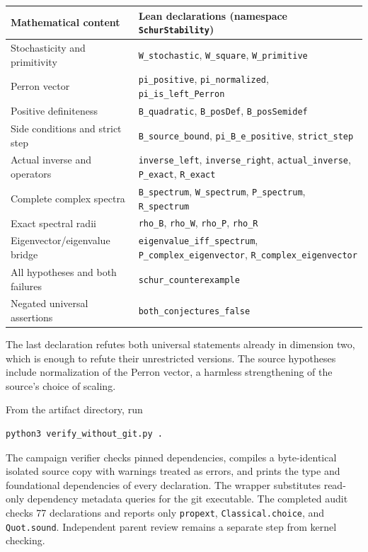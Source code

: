 \documentclass[11pt]{article}
\begin{document}
\begin{center}
\small
\begin{tabular}{@{}>{\raggedright\arraybackslash}p{}>{\raggedright\arraybackslash}p{}@{}}
\toprule
Mathematical content & Lean declarations (namespace \texttt{SchurStability})\\
\midrule
Stochasticity and primitivity & \texttt{W\_stochastic}, \texttt{W\_square}, \texttt{W\_primitive}\\
Perron vector & \texttt{pi\_positive}, \texttt{pi\_normalized}, \texttt{pi\_is\_left\_Perron}\\
Positive definiteness & \texttt{B\_quadratic}, \texttt{B\_posDef}, \texttt{B\_posSemidef}\\
Side conditions and strict step & \texttt{B\_source\_bound}, \texttt{pi\_B\_e\_positive}, \texttt{strict\_step}\\
Actual inverse and operators & \texttt{inverse\_left}, \texttt{inverse\_right}, \texttt{actual\_inverse}, \texttt{P\_exact}, \texttt{R\_exact}\\
Complete complex spectra & \texttt{B\_spectrum}, \texttt{W\_spectrum}, \texttt{P\_spectrum}, \texttt{R\_spectrum}\\
Exact spectral radii & \texttt{rho\_B}, \texttt{rho\_W}, \texttt{rho\_P}, \texttt{rho\_R}\\
Eigenvector/eigenvalue bridge & \texttt{eigenvalue\_iff\_spectrum}, \texttt{P\_complex\_eigenvector}, \texttt{R\_complex\_eigenvector}\\
All hypotheses and both failures & \texttt{schur\_counterexample}\\
Negated universal assertions & \texttt{both\_conjectures\_false}\\
\bottomrule
\end{tabular}
\end{center}

The last declaration refutes both universal statements already in dimension
two, which is enough to refute their unrestricted versions. The source
hypotheses include normalization of the Perron vector, a harmless
strengthening of the source's choice of scaling.

From the artifact directory, run
\begin{verbatim}
python3 verify_without_git.py .
\end{verbatim}
The campaign verifier checks pinned dependencies, compiles a byte-identical
isolated source copy with warnings treated as errors, and prints the type
and foundational dependencies of every declaration. The wrapper substitutes
read-only dependency metadata queries for the git executable. The completed
audit checks 77 declarations and reports only \texttt{propext},
\texttt{Classical.choice}, and \texttt{Quot.sound}. Independent parent review
remains a separate step from kernel checking.
\end{document}
